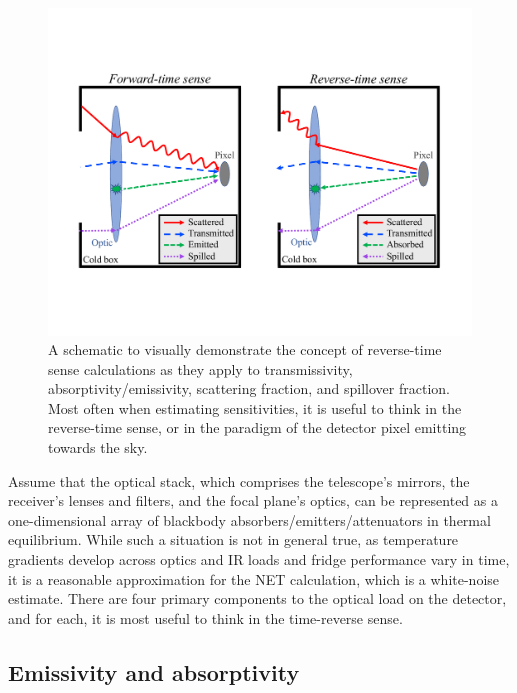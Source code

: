 \begin{figure}
    \centering
    \includegraphics[width=\linewidth, trim=2cm 4cm 2cm 4cm, clip]{SensitivityCalculation/Figures/reverse_time_sense.pdf}
    \caption{A schematic to visually demonstrate the concept of reverse-time sense calculations as they apply to transmissivity, absorptivity/emissivity, scattering fraction, and spillover fraction. Most often when estimating sensitivities, it is useful to think in the reverse-time sense, or in the paradigm of the detector pixel emitting towards the sky.}
    \label{fig:reverse_time_sense}
\end{figure}

Assume that the optical stack, which comprises the telescope's mirrors, the receiver's lenses and filters, and the focal plane's optics, can be represented as a one-dimensional array of blackbody absorbers/emitters/attenuators in thermal equilibrium. While such a situation is not in general true, as temperature gradients develop across optics and IR loads and fridge performance vary in time, it is a reasonable approximation for the NET calculation, which is a white-noise estimate. There are four primary components to the optical load on the detector, and for each, it is most useful to think in the time-reverse sense.


\subsection{Emissivity and absorptivity}
\label{sec:sensitivity_emissivity}


